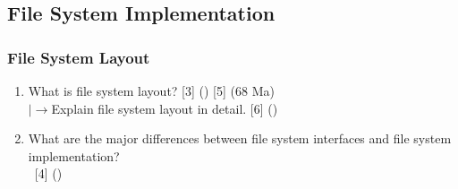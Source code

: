 \documentclass[12pt]{article}
\newcommand{\lb}{\\$\left|\rightarrow\right.$}
\newcommand{\enter}{\\\textcolor{white}{1}}
\begin{document}
	\subsection{File System Implementation}
		\subsubsection{File System Layout}
			\begin{enumerate}[noitemsep, topsep=0pt]
				\item What is file system layout? \hfill [3] () [5] (68 Ma)
				\lb Explain file system layout in detail. \hfill [6] ()

				\item What are the major differences between file system interfaces and file system implementation?
				\enter\hfill [4] ()
			\end{enumerate}
\end{document}

